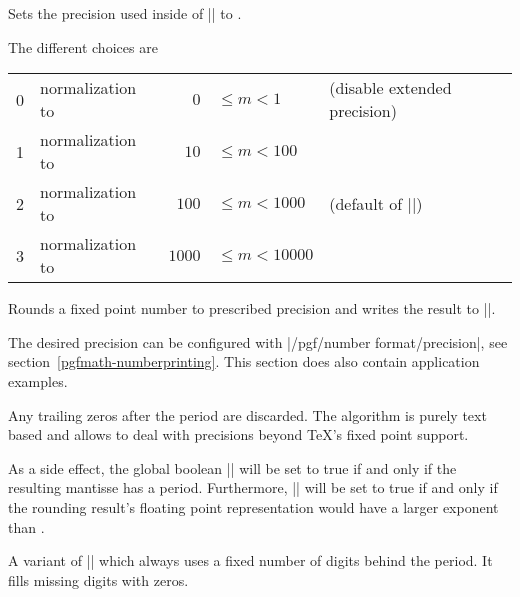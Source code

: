 \begin{command}{\pgfmathfloatsetextprecision{}}
	Sets the precision used inside of |\pgfmathfloattoextentedprecision| to .

	The different choices are
	
	\begin{tabular}{llrll}
	0 & normalization to &    $0$ & $\le m < 1$ 	& (disable extended precision)\\
	1 & normalization to &   $10$ & $\le m < 100$	\\
	2 & normalization to & 	$100$ & $\le m < 1000$	& (default of |\pgfmathfloattoextentedprecision|)\\
	3 & normalization to & $1000$ & $\le m < 10000$	\\
	\end{tabular}
\end{command}

\begin{command}{}
	Rounds a fixed point number to prescribed precision and writes the result to |\pgfmathresult|.

	The desired precision can be configured with |/pgf/number format/precision|, see section~\ref{pgfmath-numberprinting}. This section does also contain application examples.
	
	Any trailing zeros after the period are discarded. The algorithm is purely text based and allows to deal with precisions beyond \TeX's fixed point support.

	As a side effect, the global boolean |\ifpgfmathfloatroundhasperiod| will be set to true if and only if the resulting mantisse has a period. Furthermore, |\ifpgfmathfloatroundmayneedrenormalize| will be set to true if and only if the rounding result's floating point representation would have a larger exponent than . 
\begin{codeexample}[]
\pgfmathresult
\end{codeexample}
\begin{codeexample}[]
\pgfmathresult
\end{codeexample}
\begin{codeexample}[]
\pgfmathresult
\end{codeexample}
\end{command}

\begin{command}{}
	A variant of |\pgfmathroundto| which always uses a fixed number of digits behind the period. It fills missing digits with zeros.
\begin{codeexample}[]
\pgfmathresult
\end{codeexample}
\begin{codeexample}[]
\pgfmathresult
\end{codeexample}
\begin{codeexample}[]
\pgfmathresult
\end{codeexample}
\end{command}

